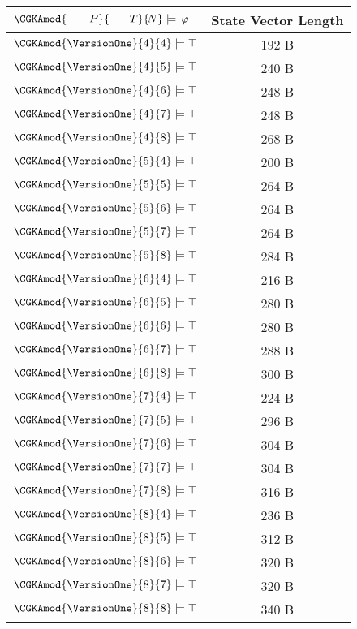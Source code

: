 \scriptsize

\begin{tabular}{ l c }

\toprule

{\normalsize $\CGKAmod{\quad\quad P}{\quad\;\;\: T}{\!N} \models \,\varphi$} &
{\normalsize State Vector Length} \\

\midrule

\( \CGKAmod{\VersionOne}{4}{4} \models \top \) & 192 B \\
\( \CGKAmod{\VersionOne}{4}{5} \models \top \) & 240 B \\
\( \CGKAmod{\VersionOne}{4}{6} \models \top \) & 248 B \\
\( \CGKAmod{\VersionOne}{4}{7} \models \top \) & 248 B \\
\( \CGKAmod{\VersionOne}{4}{8} \models \top \) & 268 B \\
\( \CGKAmod{\VersionOne}{5}{4} \models \top \) & 200 B \\
\( \CGKAmod{\VersionOne}{5}{5} \models \top \) & 264 B \\
\( \CGKAmod{\VersionOne}{5}{6} \models \top \) & 264 B \\
\( \CGKAmod{\VersionOne}{5}{7} \models \top \) & 264 B \\
\( \CGKAmod{\VersionOne}{5}{8} \models \top \) & 284 B \\
\( \CGKAmod{\VersionOne}{6}{4} \models \top \) & 216 B \\
\( \CGKAmod{\VersionOne}{6}{5} \models \top \) & 280 B \\
\( \CGKAmod{\VersionOne}{6}{6} \models \top \) & 280 B \\
\( \CGKAmod{\VersionOne}{6}{7} \models \top \) & 288 B \\
\( \CGKAmod{\VersionOne}{6}{8} \models \top \) & 300 B \\
\( \CGKAmod{\VersionOne}{7}{4} \models \top \) & 224 B \\
\( \CGKAmod{\VersionOne}{7}{5} \models \top \) & 296 B \\
\( \CGKAmod{\VersionOne}{7}{6} \models \top \) & 304 B \\
\( \CGKAmod{\VersionOne}{7}{7} \models \top \) & 304 B \\
\( \CGKAmod{\VersionOne}{7}{8} \models \top \) & 316 B \\
\( \CGKAmod{\VersionOne}{8}{4} \models \top \) & 236 B \\
\( \CGKAmod{\VersionOne}{8}{5} \models \top \) & 312 B \\
\( \CGKAmod{\VersionOne}{8}{6} \models \top \) & 320 B \\
\( \CGKAmod{\VersionOne}{8}{7} \models \top \) & 320 B \\
\( \CGKAmod{\VersionOne}{8}{8} \models \top \) & 340 B \\

\bottomrule

\end{tabular}
